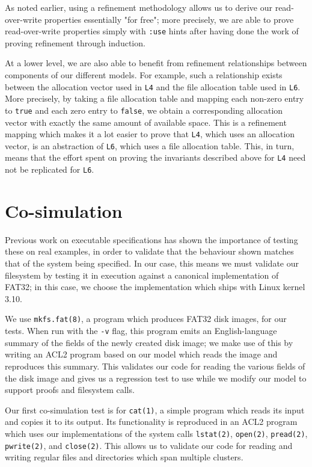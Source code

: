 \documentclass[submission,copyright,creativecommons]{eptcs}
\begin{document}
As noted earlier, using a refinement methodology allows us to derive
our read-over-write properties essentially "for free"; more precisely,
we are able to prove read-over-write properties simply with
\texttt{:use} hints after having done the work of proving refinement
through induction.

At a lower level, we are also able to benefit from refinement
relationships between components of our different models. For example,
such a relationship exists between the allocation vector used in
\texttt{L4} and the file allocation table used in \texttt{L6}. More
precisely, by taking a file allocation table and mapping each non-zero
entry to \texttt{true} and each zero entry to \texttt{false}, we
obtain a corresponding allocation vector with exactly the same amount
of available space. This is a refinement mapping which makes it a lot
easier to prove that \texttt{L4}, which uses an allocation vector, is
an abstraction of \texttt{L6}, which uses a file allocation
table. This, in turn, means that the effort spent on proving the
invariants described above for \texttt{L4} need not be replicated for
\texttt{L6}.

\section{Co-simulation}

Previous work on executable specifications \cite{} has shown the
importance of testing these on real examples, in order to validate
that the behaviour shown matches that of the system being
specified. In our case, this means we must validate our filesystem by
testing it in execution against a canonical implementation of FAT32;
in this case, we choose the implementation which ships with Linux
kernel 3.10.

We use \texttt{mkfs.fat(8)}, a program which produces FAT32 disk
images, for our tests. When run with the \texttt{-v} flag, this
program emits an English-language summary of the fields of the newly
created disk image; we make use of this by writing an ACL2 program
based on our model which reads the image and reproduces this
summary. This validates our code for reading the various fields of the
disk image and gives us a regression test to use while we modify our
model to support proofs and filesystem calls.

Our first co-simulation test is for \texttt{cat(1)}, a simple program
which reads its input and copies it to its output. Its functionality
is reproduced in an ACL2 program which uses our implementations of the
system calls \texttt{lstat(2)}, \texttt{open(2)}, \texttt{pread(2)},
\texttt{pwrite(2)}, and \texttt{close(2)}. This allows us to validate
our code for reading and writing regular files and directories which
span multiple clusters.
\end{document}

